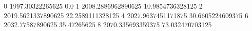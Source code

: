 0 1997.30322265625 0.0
1 2008.2886962890625 10.9854736328125
2 2019.5621337890625 22.2589111328125
4 2027.9637451171875 30.6605224609375
6 2032.77587890625 35.47265625
8 2070.335693359375 73.032470703125

